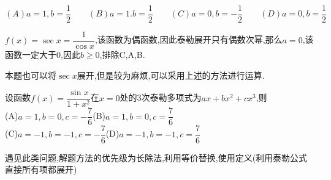 \documentclass[10pt, a4paper, oneside, UTF8]{ctexbook}
\begin{document}
\begin{sloppypar}
\begin{problem}
        $(A)a=1,b=\dfrac{1}{2}  \qquad (B)a=1.b=\dfrac{1}{2}  \qquad (C)a=0,b=-\dfrac{1}{2} \qquad  (D)a=0,b=\dfrac{1}{2}$
    \end{problem}
    \begin{solution}
        $f(x)=\sec x=\dfrac{1}{\cos x}$,该函数为偶函数,因此泰勒展开只有偶数次幂,那么$a=0$,该函数一定大于0,因此$b \geq 0$,排除C,A,B.
    \end{solution}
    \begin{note}
        本题也可以将$\sec x$展开,但是较为麻烦,可以采用上述的方法进行运算.
    \end{note}
    \begin{problem}
        设函数$f(x)=\dfrac{\sin x}{1+x^2}$在$x=0$处的3次泰勒多项式为$ax + b x ^ 2 + c x ^ 3 $,则
        \\(A)$a=1,b=0,c=-\dfrac{7}{6}$\quad (B)$a=1,b=0,c=\dfrac{7}{6}$\\ (C)$a=-1,b=-1,c=-\dfrac{7}{6}$\quad (D)$a=-1,b=-1,c=\dfrac{7}{6}$
    \end{problem}
    \begin{note}
        遇见此类问题,解题方法的优先级为长除法,利用等价替换,使用定义(利用泰勒公式直接所有项都展开)
    \end{note}

\end{sloppypar}
\end{document}
